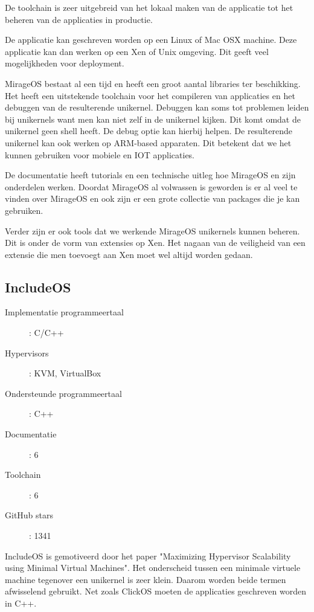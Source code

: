 \documentclass[pdftex,a4paper,12pt,twoside]{report}
\begin{document}
De toolchain is zeer uitgebreid van het lokaal maken van de applicatie tot het beheren van de applicaties in productie.

De applicatie kan geschreven worden op een Linux of Mac OSX machine. Deze applicatie kan dan werken op een Xen of Unix omgeving. Dit geeft veel mogelijkheden voor deployment.

MirageOS bestaat al een tijd en heeft een groot aantal libraries ter beschikking. Het heeft een uitstekende toolchain voor het compileren van applicaties en het debuggen van de resulterende unikernel. Debuggen kan soms tot problemen leiden bij unikernels want men kan niet zelf in de unikernel kijken. Dit komt omdat de unikernel geen shell heeft. De debug optie kan hierbij helpen. De resulterende unikernel kan ook werken op ARM-based apparaten. Dit betekent dat we het kunnen gebruiken voor mobiele en IOT applicaties.

De documentatie heeft tutorials en een technische uitleg hoe MirageOS en zijn onderdelen werken. Doordat MirageOS al volwassen is geworden is er al veel te vinden over MirageOS en ook zijn er een grote collectie van packages die je kan gebruiken.

Verder zijn er ook tools dat we werkende MirageOS unikernels kunnen beheren. Dit is onder de vorm van extensies op Xen. Het nagaan van de veiligheid van een extensie die men toevoegt aan Xen moet wel altijd worden gedaan.

\subsection{IncludeOS}
\begin{description}
  \item [Implementatie programmeertaal]: C/C++
  \item [Hypervisors]: KVM, VirtualBox
  \item [Ondersteunde programmeertaal]: C++
  \item [Documentatie]: 6
  \item [Toolchain]: 6
  \item [GitHub stars]: 1341
\end{description}

IncludeOS is gemotiveerd door het paper "Maximizing Hypervisor Scalability using Minimal Virtual Machines". Het onderscheid tussen een minimale virtuele machine tegenover een unikernel is zeer klein. Daarom worden beide termen afwisselend gebruikt. Net zoals ClickOS moeten de applicaties geschreven worden in C++.
\end{document}
